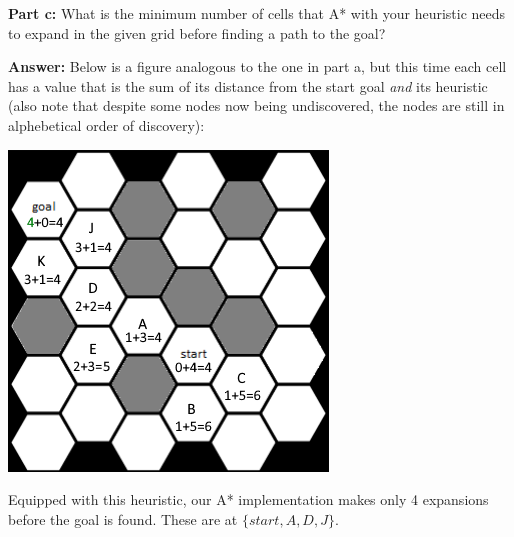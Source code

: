 \documentclass{article}
\begin{document}
\noindent\textbf{Part c:} What is the minimum number of cells that A* with your heuristic needs to expand in the given grid before finding a path to the goal?
\bigskip

\noindent\textbf{Answer:} Below is a figure analogous to the one in part a, but this time each cell has a value that is the sum of its distance from the start goal \textit{and} its heuristic (also note that despite some nodes now being undiscovered, the nodes are still in alphebetical order of discovery):
\begin{center}
  \includegraphics[scale=.75]{hextiles3.png}
\end{center}

Equipped with this heuristic, our A* implementation makes only 4 expansions before the goal is found. These are at $\{start,A,D,J\}$.


\newpage
\end{document}
